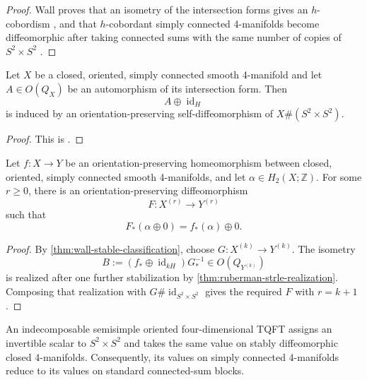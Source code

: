\begin{proof}
Wall proves that an isometry of the intersection forms gives an
$h$-cobordism \cite[Theorem~2]{Wall1964}, and that $h$-cobordant simply
connected 4-manifolds become diffeomorphic after taking connected sums
with the same number of copies of $S^2\times S^2$
\cite[Theorem~3]{Wall1964}.
\end{proof}

\begin{theorem}
\label{thm:ruberman-strle-realization}
Let $X$ be a closed, oriented, simply connected smooth 4-manifold and let
$A\in O(Q_X)$ be an automorphism of its intersection form.  Then
\[
  A\oplus\operatorname{id}_H
\]
is induced by an orientation-preserving self-diffeomorphism of
$X\#(S^2\times S^2)$.
\end{theorem}

\begin{proof}
This is \cite[Theorem~2.1]{RubermanStrle2022}.
\end{proof}

\begin{corollary}
\label{cor:marked-stable-realization}
Let $f\colon X\to Y$ be an orientation-preserving homeomorphism between
closed, oriented, simply connected smooth 4-manifolds, and let
$\alpha\in H_2(X;\mathbb Z)$.  For some $r\geq 0$, there is an
orientation-preserving diffeomorphism
\[
  F\colon X^{(r)}\longrightarrow Y^{(r)}
\]
such that
\[
  F_*(\alpha\oplus0)=f_*(\alpha)\oplus0.
\]
\end{corollary}

\begin{proof}
By \cref{thm:wall-stable-classification}, choose
$G\colon X^{(k)}\to Y^{(k)}$.  The isometry
\[
  B:=(f_*\oplus\operatorname{id}_{kH})G_*^{-1}
  \in O(Q_{Y^{(k)}})
\]
is realized after one further stabilization by
\cref{thm:ruberman-strle-realization}.  Composing that realization with
$G\#\operatorname{id}_{S^2\times S^2}$ gives the required $F$ with
$r=k+1$.
\end{proof}

\begin{theorem}
\label{thm:reutter-stable-evaluation}
An indecomposable semisimple oriented four-dimensional TQFT assigns an
invertible scalar to $S^2\times S^2$ and takes the same value on stably
diffeomorphic closed 4-manifolds.  Consequently, its values on simply
connected 4-manifolds reduce to its values on standard connected-sum
blocks.
\end{theorem}

